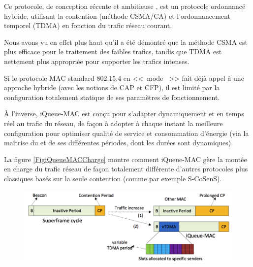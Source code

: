 Ce protocole, de conception récente et ambitieuse \cite{iQueueMAC}, est un
protocole ordonnancé hybride, utilisant la contention (méthode CSMA/CA)
et l'ordonnancement temporel (TDMA) en fonction du trafic réseau courant.

Nous avons vu en effet plus haut qu'il a été démontré que la méthode CSMA
est plus efficace pour le traitement des faibles trafics, tandis que TDMA
est nettement plus appropriée pour supporter les trafics intenses.

Si le protocole MAC standard 802.15.4 en <<~mode ~>> fait
déjà appel à une approche hybride (avec les notions de CAP et CFP), il est
limité par la configuration totalement statique de ses paramètres de
fonctionnement.

À l'inverse, iQueue-MAC est conçu pour s'adapter dynamiquement et en
temps réel au trafic du réseau, de façon à adopter à chaque instant la
meilleure configuration pour optimiser qualité de service et consommation
d'énergie (via la maîtrise du  et de ses différentes
périodes, dont les durées sont dynamiques).

La figure \vref{FigiQueueMACCharge} montre comment iQueue-MAC gère la
montée en charge du trafic réseau de façon totalement différente d'autres
protocoles plus classiques basés sur la seule contention (comme par exemple
S-CoSenS).

\begin{figure}[!hbt]
\centering
\includegraphics[width=12.5cm]{images/ch3-iqueue-mac-charge.png}
\label{FigiQueueMACCharge}
\end{figure}

